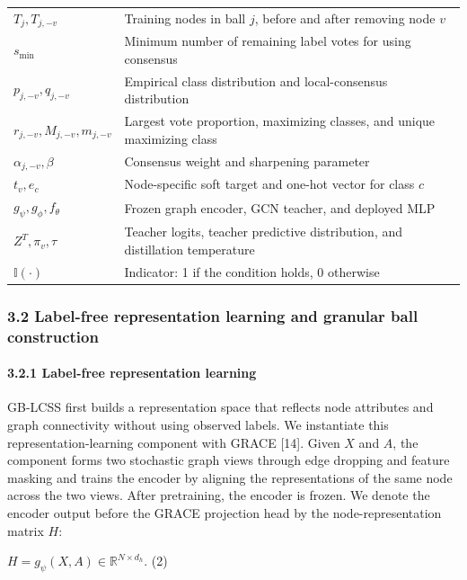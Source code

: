 \begin{longtable}[]{@{}
  >{\raggedright\arraybackslash}p{}
  >{\raggedright\arraybackslash}p{}@{}}
\(T_{j},T_{j, - v}\) & Training nodes in ball \(j\), before and after removing node \(v\) \\
\(s_{\min}\) & Minimum number of remaining label votes for using consensus \\
\(p_{j, - v},q_{j, - v}\) & Empirical class distribution and local-consensus distribution \\
\(r_{j, - v},M_{j, - v},m_{j, - v}\) & Largest vote proportion, maximizing classes, and unique maximizing class \\
\(\alpha_{j, - v},\beta\) & Consensus weight and sharpening parameter \\
\(t_{v},e_{c}\) & Node-specific soft target and one-hot vector for class \(c\) \\
\(g_{\psi},g_{\phi},f_{\theta}\) & Frozen graph encoder, GCN teacher, and deployed MLP \\
\(Z^{T},\pi_{v},\tau\) & Teacher logits, teacher predictive distribution, and distillation temperature \\
\(\mathbb{I}( \cdot )\)\hspace{0pt} & Indicator: 1 if the condition holds, 0 otherwise \\
\end{longtable}

\subsubsection{3.2 Label-free representation learning and granular ball construction}\label{label-free-representation-learning-and-granular-ball-construction}

\paragraph{3.2.1 Label-free representation learning}\label{label-free-representation-learning}

GB-LCSS first builds a representation space that reflects node attributes and graph connectivity without using observed labels. We instantiate this representation-learning component with GRACE {[}14{]}. Given \(X\) and \(A\), the component forms two stochastic graph views through edge dropping and feature masking and trains the encoder by aligning the representations of the same node across the two views. After pretraining, the encoder is frozen. We denote the encoder output before the GRACE projection head by the node-representation matrix \(H\):

\(H = g_{\psi}(X,A) \in \mathbb{R}^{N \times d_{h}}.\) (2)

